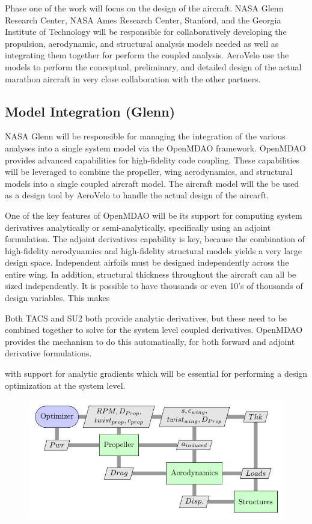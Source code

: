 \documentclass[]{aiaa-tc}
\begin{document}
    Phase one of the work will focus on the design of the aircraft. NASA Glenn Research Center, 
    NASA Ames Research Center, Stanford, and the Georgia Institute of Technology will be responsible 
    for collaboratively developing the propulsion, aerodynamic, and structural analysis 
    models needed as well as integrating them together for perform the coupled analysis. AeroVelo 
    use the models to perform the conceptual, preliminary, and detailed design of the actual marathon 
    aircraft in very close collaboration with the other partners. 

    \subsection{Model Integration (Glenn)}

    NASA Glenn will be responsible for managing the integration of the various analyses into 
    a single system model via the OpenMDAO framework. OpenMDAO provides advanced 
    capabilities for high-fidelity code coupling. These capabilities will be leveraged to combine the 
    propeller, wing aerodynamics, and structural models into a single coupled aircraft model. The aircraft 
    model will the be used as a design tool by AeroVelo to handle the actual design of the aircarft. 

    One of the key features of OpenMDAO will be its support for computing system derivatives
    analytically or semi-analytically, specifically using an adjoint formulation. The adjoint
    derivatives capability is key, because the combination of high-fidelity aerodynamics and high-fidelity 
    structural models yields a very large design space. Independent airfoils must be designed independently 
    across the entire wing. In addition, structural thickness throughout the aircraft can all be sized independently. 
    It is possible to have thousands or even 10's of thousands of design variables. This makes 


    Both TACS and 
    SU2 both provide analytic derivatives, but these need to be combined together to solve for the system level 
    coupled derivatives. OpenMDAO provides the mechanism to do this automatically, for both forward and adjoint 
    derivative formulations. 

    with support for analytic gradients which will be essential 
    for performing a design optimization at the system level. 

    \begin{figure} \centering
        \includegraphics[width=.75\textwidth]{xdsm/overall}
    \end{figure}
\end{document}

